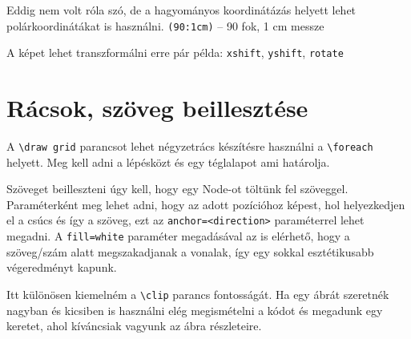 Eddig nem volt róla szó, de a hagyományos koordinátázás helyett lehet polárkoordinátákat is használni. \verb|(90:1cm)| -- 90 fok, 1 cm messze

A képet lehet transzformálni erre pár példa: \verb|xshift|, \verb|yshift|, \verb|rotate|

\begin{Example}
\end{Example}

\section{Rácsok, szöveg beillesztése}

A \verb|\draw grid| parancsot lehet négyzetrács készítésre használni a \verb|\foreach| helyett. Meg kell adni a lépésközt és egy téglalapot ami határolja.

Szöveget beilleszteni úgy kell, hogy egy Node-ot töltünk fel szöveggel. Paraméterként meg lehet adni, hogy az adott pozícióhoz képest, hol helyezkedjen el a csúcs és így a szöveg, ezt az \verb|anchor=<direction>| paraméterrel lehet megadni. A \verb|fill=white| paraméter megadásával az is elérhető, hogy a szöveg/szám alatt megszakadjanak a vonalak, így egy sokkal esztétikusabb végeredményt kapunk. 

Itt különösen kiemelném a \verb|\clip| parancs fontosságát. Ha egy ábrát szeretnék nagyban és kicsiben is használni elég megismételni a kódot és megadunk egy keretet, ahol kíváncsiak vagyunk az ábra részleteire. 

